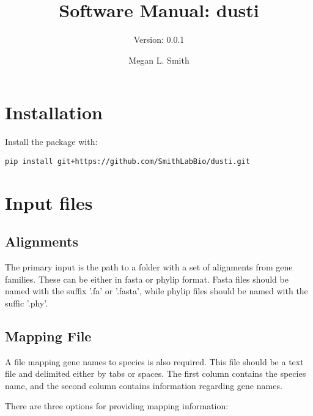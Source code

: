 \documentclass{scrartcl}
\title{Software Manual: dusti}
\subtitle{Version: 0.0.1}
\author{Megan L. Smith}
\begin{document}
\maketitle

\tableofcontents

\newpage

\section{Installation}

Install the package with:

\texttt{pip install git+https://github.com/SmithLabBio/dusti.git}

\section{Input files}

\subsection{Alignments}

The primary input is the path to a folder with a set of alignments from gene families. These can be either in fasta or phylip format. Fasta files should be named with the suffix '.fa' or '.fasta', while phylip files should be named with the suffic '.phy'.

\subsection{Mapping File}

A file mapping gene names to species is also required. This file should be a text file and delimited either by tabs or spaces. 
The first column contains the species name, and the second column contains information regarding gene names.

There are three options for providing mapping information:
\end{document}
